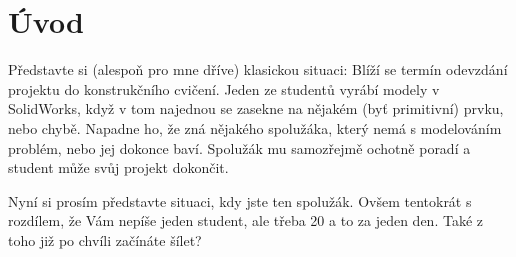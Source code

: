 \chapter*{Úvod}
Představte si (alespoň pro mne dříve) klasickou situaci: 
Blíží se termín odevzdání projektu do konstrukčního cvičení.
Jeden ze studentů vyrábí modely v SolidWorks, když v tom najednou se zasekne na nějakém (byť primitivní) prvku, nebo chybě.
Napadne ho, že zná nějakého spolužáka, který nemá s modelováním problém, nebo jej dokonce baví.
Spolužák mu samozřejmě ochotně poradí a student může svůj projekt dokončit.

Nyní si prosím představte situaci, kdy jste ten spolužák.
Ovšem tentokrát s rozdílem, že Vám nepíše jeden student, ale třeba 20 a to za jeden den.
Také z toho již po chvíli začínáte šílet?

\newpage
